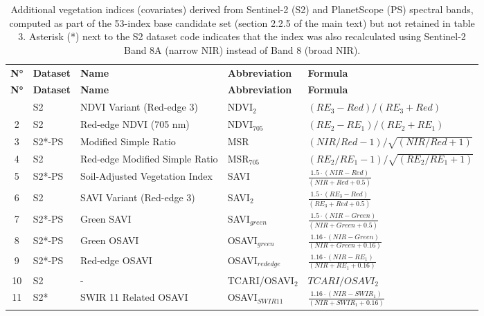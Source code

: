 \documentclass[
  british,
  suppldata]{interact}
\begin{document}
\begingroup\scriptsize

\begin{longtable}{@{}c l >{\raggedright\arraybackslash}p{3.2cm} >{\raggedright\arraybackslash}p{2.0cm} >{\raggedright\arraybackslash}p{4.6cm}@{}}

\caption{\label{tbl-s1}Additional vegetation indices (covariates) derived from Sentinel-2 (S2) and PlanetScope (PS) spectral bands, computed as part of the 53-index base candidate set (section 2.2.5 of the main text) but not retained in table 3. Asterisk (*) next to the S2 dataset code indicates that the index was also recalculated using Sentinel-2 Band 8A (narrow NIR) instead of Band 8 (broad NIR).}

\tabularnewline

\\
\toprule
\textbf{N°} & \textbf{Dataset} & \textbf{Name} & \textbf{Abbreviation} & \textbf{Formula} \\
\midrule
\endfirsthead
\toprule
\textbf{N°} & \textbf{Dataset} & \textbf{Name} & \textbf{Abbreviation} & \textbf{Formula} \\
\midrule
\endhead
\bottomrule
\endlastfoot
1 & S2 & NDVI Variant (Red-edge 3) & NDVI$_{2}$ & $(RE_{3} - Red)/(RE_{3} + Red)$ \\
2 & S2 & Red-edge NDVI (705 nm) & NDVI$_{705}$ & $(RE_{2} - RE_{1})/(RE_{2} + RE_{1})$ \\
3 & S2*-PS & Modified Simple Ratio & MSR & $(NIR/Red - 1)/\sqrt{(NIR/Red + 1)}$ \\
4 & S2 & Red-edge Modified Simple Ratio & MSR$_{705}$ & $(RE_{2}/RE_{1} - 1)/\sqrt{(RE_{2}/RE_{1} + 1)}$ \\
5 & S2*-PS & Soil-Adjusted Vegetation Index & SAVI & $\frac{1.5 \cdot (NIR - Red)}{(NIR + Red + 0.5)}$ \\
6 & S2 & SAVI Variant (Red-edge 3) & SAVI$_{2}$ & $\frac{1.5 \cdot (RE_{3} - Red)}{(RE_{3} + Red + 0.5)}$ \\
7 & S2*-PS & Green SAVI & SAVI$_{green}$ & $\frac{1.5 \cdot (NIR - Green)}{(NIR + Green + 0.5)}$ \\
8 & S2*-PS & Green OSAVI & OSAVI$_{green}$ & $\frac{1.16 \cdot (NIR - Green)}{(NIR + Green + 0.16)}$ \\
9 & S2*-PS & Red-edge OSAVI & OSAVI$_{rededge}$ & $\frac{1.16 \cdot (NIR - RE_{1})}{(NIR + RE_{1} + 0.16)}$ \\
10 & S2 & - & TCARI/OSAVI$_{2}$ & $TCARI/{OSAVI}_{2}$ \\
11 & S2* & SWIR 11 Related OSAVI & OSAVI$_{SWIR11}$ & $\frac{1.16 \cdot (NIR - SWIR_{1})}{(NIR + SWIR_{1} + 0.16)}$ \\

\end{longtable}
\end{document}
